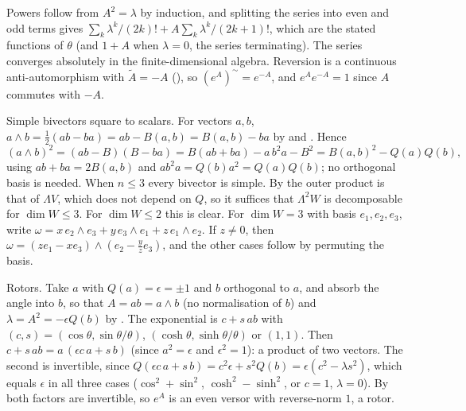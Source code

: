 Powers follow from $A^{2} = \lambda$ by induction, and splitting the series into even and odd terms gives $\sum_k \lambda^{k}/(2k)! + A \sum_k \lambda^{k}/(2k+1)!$, which are the stated functions of $\theta$ (and $1 + A$ when $\lambda = 0$, the series terminating). The series converges absolutely in the finite-dimensional algebra. Reversion is a continuous anti-automorphism with $\tilde{A} = -A$ (), so $(e^{A})^{\sim} = e^{-A}$, and $e^{A}e^{-A} = 1$ since $A$ commutes with $-A$.

Simple bivectors square to scalars. For vectors $a, b$, $a \wedge b = \tfrac12(ab - ba) = ab - B(a, b) = B(a, b) - ba$ by  and . Hence
\begin{equation}
(a \wedge b)^{2} = (ab - B)(B - ba) = B(ab + ba) - a\, b^{2} a - B^{2} = B(a, b)^{2} - Q(a) Q(b),
\end{equation}
using $ab + ba = 2B(a, b)$ and $a b^{2} a = Q(b) a^{2} = Q(a)Q(b)$; no orthogonal basis is needed. When $n \le 3$ every bivector is simple. By  the outer product is that of $\Lambda V$, which does not depend on $Q$, so it suffices that $\Lambda^{2} W$ is decomposable for $\dim W \le 3$. For $\dim W \le 2$ this is clear. For $\dim W = 3$ with basis $e_1, e_2, e_3$, write $\omega = x\, e_2 \wedge e_3 + y\, e_3 \wedge e_1 + z\, e_1 \wedge e_2$. If $z \ne 0$, then $\omega = (z e_1 - x e_3) \wedge (e_2 - \tfrac{y}{z} e_3)$, and the other cases follow by permuting the basis.

Rotors. Take $a$ with $Q(a) = \epsilon = \pm 1$ and $b$ orthogonal to $a$, and absorb the angle into $b$, so that $A = ab = a \wedge b$ (no normalisation of $b$) and $\lambda = A^{2} = -\epsilon Q(b)$ by . The exponential is $c + s\, ab$ with $(c, s) = (\cos\theta, \sin\theta/\theta)$, $(\cosh\theta, \sinh\theta/\theta)$ or $(1, 1)$. Then $c + s\, ab = a\,(\epsilon c\, a + s\, b)$ (since $a^{2} = \epsilon$ and $\epsilon^{2} = 1$): a product of two vectors. The second is invertible, since $Q(\epsilon c\, a + s\, b) = c^{2}\epsilon + s^{2} Q(b) = \epsilon(c^{2} - \lambda s^{2})$, which equals $\epsilon$ in all three cases ($\cos^{2} + \sin^{2}$, $\cosh^{2} - \sinh^{2}$, or $c = 1$, $\lambda = 0$). By  both factors are invertible, so $e^{A}$ is an even versor with reverse-norm $1$, a rotor.
